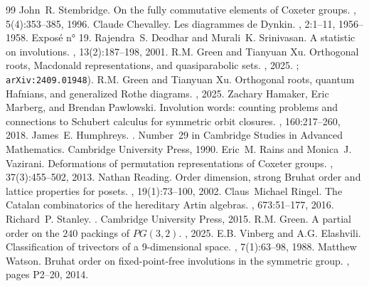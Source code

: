 \documentclass[10pt,a4paper]{amsart}
\numberwithin{equation}{section}
\begin{document}
\begin{thebibliography}{99}
 John~R. Stembridge. \newblock On the fully commutative elements of {C}oxeter groups. , 5(4):353--385, 1996.
 Claude Chevalley. \newblock Les diagrammes de {Dynkin}. , 2:1--11, 1956--1958. \newblock Expos{\'e} n° 19.
 Rajendra~S. Deodhar and Murali~K. Srinivasan. \newblock A statistic on involutions. , 13(2):187--198, 2001.
 R.M. Green and Tianyuan Xu. \newblock Orthogonal roots, {M}acdonald representations, and quasiparabolic sets. , 2025. ; {\tt arXiv:2409.01948}).
 R.M. Green and Tianyuan Xu. \newblock Orthogonal roots, quantum {H}afnians, and generalized {R}othe diagrams. , 2025.
 Zachary Hamaker, Eric Marberg, and Brendan Pawlowski. \newblock Involution words: counting problems and connections to {S}chubert calculus for symmetric orbit closures. , 160:217--260, 2018.
 James~E. Humphreys. . \newblock Number~29 in Cambridge Studies in Advanced Mathematics. Cambridge University Press, 1990.
 Eric~M. Rains and Monica~J. Vazirani. \newblock Deformations of permutation representations of {C}oxeter groups. , 37(3):455--502, 2013.
 Nathan Reading. \newblock Order dimension, strong {B}ruhat order and lattice properties for posets. , 19(1):73--100, 2002.
 Claus~Michael Ringel. \newblock The {C}atalan combinatorics of the hereditary {A}rtin algebras. , 673:51--177, 2016.
 Richard~P. Stanley. . \newblock Cambridge University Press, 2015.
 R.M. Green. \newblock A partial order on the $240$ packings of ${P}{G}(3, 2)$. , 2025.
 E.B. Vinberg and A.G. Elashvili. \newblock Classification of trivectors of a 9-dimensional space. , 7(1):63--98, 1988.
 Matthew Watson. \newblock Bruhat order on fixed-point-free involutions in the symmetric group. , pages P2--20, 2014.
\end{thebibliography}
\end{document}
